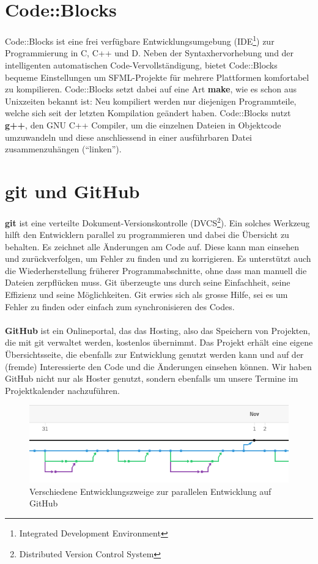 \documentclass[11pt,a4paper]{scrbook}
\newcommand{\q}[1]{``#1''}
\begin{document}
\section{Code::Blocks}
Code::Blocks ist eine frei verfügbare Entwicklungsumgebung (IDE\footnote{Integrated Development Environment}) zur Programmierung in C, C++ und D.
Neben der Syntaxhervorhebung und der intelligenten automatischen Code-Vervollständigung, bietet Code::Blocks bequeme Einstellungen um SFML-Projekte für mehrere Plattformen
komfortabel zu kompilieren. Code::Blocks setzt dabei auf eine Art \textbf{make}, wie es schon aus Unixzeiten bekannt ist: Neu kompiliert werden nur diejenigen Programmteile, welche sich
seit der letzten Kompilation geändert haben. Code::Blocks nutzt \textbf{g++}, den GNU C++ Compiler, um die einzelnen Dateien in Objektcode umzuwandeln und diese
anschliessend in einer ausführbaren Datei zusammenzuhängen (\q{linken}).

\section{git und GitHub}
\textbf{git} ist eine verteilte Dokument-Versionskontrolle (DVCS\footnote{Distributed Version Control System}). Ein solches Werkzeug hilft
den Entwicklern parallel zu programmieren und dabei die Übersicht zu behalten. Es zeichnet alle Änderungen am Code auf.  Diese kann man einsehen und zurückverfolgen, um Fehler zu finden und zu korrigieren. Es unterstützt auch die Wiederherstellung früherer Programmabschnitte, ohne dass man
manuell die Dateien zerpflücken muss. 
Git überzeugte uns durch seine Einfachheit, seine Effizienz und seine Möglichkeiten.
Git erwies sich als grosse Hilfe, sei es um Fehler zu finden oder einfach zum synchronisieren des Codes.
\\
\\
\textbf{GitHub} ist ein
Onlineportal, das das Hosting, also das Speichern von Projekten, die mit git verwaltet werden, kostenlos übernimmt. Das Projekt erhält eine eigene Übersichtsseite,
die ebenfalls zur Entwicklung genutzt werden kann und auf der (fremde) Interessierte den Code und die Änderungen einsehen können. Wir haben GitHub nicht nur
als Hoster genutzt, sondern ebenfalls um unsere Termine im Projektkalender nachzuführen.
\begin{figure}
\centering
\includegraphics[scale=1]{img/branches.png}
\caption{Verschiedene Entwicklungszweige zur parallelen Entwicklung auf GitHub}
\label{fig:branches}
\end{figure}
\end{document}
